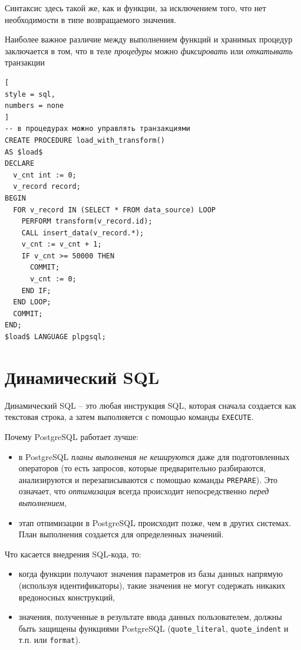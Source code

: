 \documentclass[%
	11pt,
	a4paper,
	utf8,
		]{article}
\begin{document}
Синтаксис здесь такой же, как и функции, за исключением того, что нет необходимости в типе возвращаемого значения.

Наиболее важное различие между выполнением функций и хранимых процедур заключается в том, что в теле \emph{процедуры} можно \emph{фиксировать} или \emph{откатывать} транзакции
\begin{lstlisting}[
style = sql,
numbers = none
]
-- в процедурах можно управлять транзакциями
CREATE PROCEDURE load_with_transform()
AS $load$
DECLARE
  v_cnt int := 0;
  v_record record;
BEGIN
  FOR v_record IN (SELECT * FROM data_source) LOOP
    PERFORM transform(v_record.id);
    CALL insert_data(v_record.*);
    v_cnt := v_cnt + 1;
    IF v_cnt >= 50000 THEN
      COMMIT;
      v_cnt := 0;
    END IF;
  END LOOP;
  COMMIT;
END;
$load$ LANGUAGE plpgsql;
\end{lstlisting}

\section{Динамический SQL}

Динамический SQL -- это любая инструкция SQL, которая сначала создается как текстовая строка, а затем выполняется с помощью команды \verb|EXECUTE|.

Почему PostgreSQL работает лучше:
\begin{itemize}
	\item в PostgreSQL \emph{планы выполнения не кешируются} даже для подготовленных операторов (то есть запросов, которые предварительно разбираются, анализируются и перезаписываются с помощью команды \verb|PREPARE|). Это означает, что \emph{оптимизация} всегда происходит непосредственно \emph{перед выполнением},
	
	\item этап отпимизации в PostgreSQL происходит позже, чем в других системах. План выполнения создается для определенных значений.
\end{itemize}

Что касается внедрения SQL-кода, то:
\begin{itemize}
	\item когда функции получают значения параметров из базы данных напрямую (используя идентификаторы), такие значения не могут содержать никаких вредоносных конструкций,
	
	\item значения, полученные в результате ввода данных пользователем, должны быть защищены функциями PostgreSQL (\verb|quote_literal|, \verb|quote_indent| и т.п. или \verb|format|).
\end{itemize}
\end{document}
